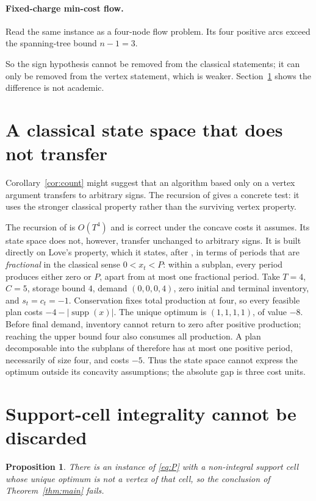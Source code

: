 \documentclass[review,11pt]{elsarticle}
\newtheorem{proposition}[theorem]{Proposition}
\theoremstyle{remark}
\theoremstyle{definition}
\newcommand{\supp}{\operatorname{supp}}
\begin{document}
\paragraph{Fixed-charge min-cost flow.} Read the same instance as a four-node flow
problem. Its four positive arcs exceed the spanning-tree bound $n-1=3$.

So the sign hypothesis cannot be removed from the classical statements; it can only be
removed from the vertex statement, which is weaker. Section~\ref{sec:alg} shows the
difference is not academic.

\section{A classical state space that does not transfer}\label{sec:alg}

Corollary~\ref{cor:count} might suggest that an algorithm based only on a vertex argument
transfers to arbitrary signs. The recursion of \cite{apr15} gives a concrete test: it uses
the stronger classical property rather than the surviving vertex property.

The recursion of \cite{apr15} is $O(T^4)$ and is correct under the concave costs it
assumes. Its state space does not, however, transfer unchanged to arbitrary signs. It is
built directly on Love's property, which it states, after
\cite{love73}, in terms of periods that are \emph{fractional} in the classical sense
$0<x_t<P$: within a subplan, every period produces either zero or $P$, apart from at most
one fractional period. Take $T=4$, $C=5$, storage
bound $4$, demand $(0,0,0,4)$, zero initial and terminal inventory, and $s_t=c_t=-1$.
Conservation fixes total production at four, so every feasible plan costs
$-4-|\supp(x)|$. The unique optimum is $(1,1,1,1)$, of value $-8$. Before final demand,
inventory cannot return to zero after positive production; reaching the upper bound four
also consumes all production. A plan decomposable into the subplans of \cite{apr15}
therefore has at most one positive period, necessarily of size four, and costs $-5$.
Thus the state space cannot express the optimum outside its concavity assumptions; the
absolute gap is three cost units.

\section{Support-cell integrality cannot be discarded}\label{sec:sharp}

\begin{proposition}\label{prop:sharp}
There is an instance of \eqref{eq:P} with a non-integral support cell whose unique optimum
is not a vertex of that cell, so the conclusion of Theorem~\ref{thm:main} fails.
\end{proposition}
\end{document}
